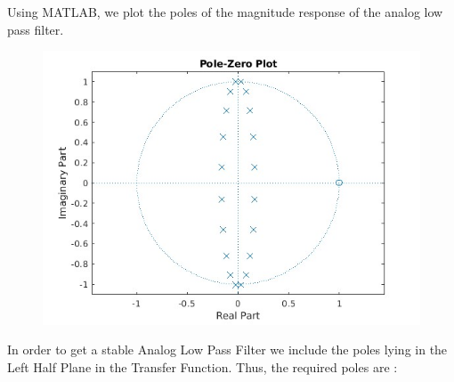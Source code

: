 \documentclass{article}
\begin{document}
Using MATLAB, we plot the poles of the magnitude response of the analog low pass filter.
\begin{figure}[H]
    \centering
    \includegraphics[scale = 0.5]{root_bsf.jpg}
    \caption{}
    \label{fig:my_label}
\end{figure}
In order to get a stable Analog Low Pass Filter we include the poles lying in the Left Half Plane in the Transfer Function. Thus, the required poles are :
        
\end{document}
